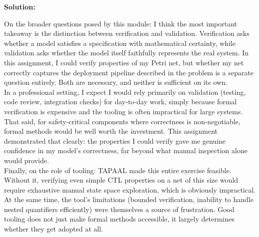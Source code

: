\documentclass[10pt]{article}
\newcounter{question}
\newenvironment{solution}{
	\vspace{1em}\par\large\textbf{{Solution:}}\par\vspace{1em}
}{
	\vspace{1em}
}
\begin{document}
\begin{solution}
	On the broader questions posed by this module: I think the most important takeaway is the distinction between verification and validation. Verification asks whether a model satisfies a specification with mathematical certainty, while validation asks whether the model itself faithfully represents the real system. In this assignment, I could verify properties of my Petri net, but whether my net correctly captures the deployment pipeline described in the problem is a separate question entirely. Both are necessary, and neither is sufficient on its own. \\

	In a professional setting, I expect I would rely primarily on validation (testing, code review, integration checks) for day-to-day work, simply because formal verification is expensive and the tooling is often impractical for large systems. That said, for safety-critical components where correctness is non-negotiable, formal methods would be well worth the investment. This assignment demonstrated that clearly: the properties I could verify gave me genuine confidence in my model's correctness, far beyond what manual inspection alone would provide. \\

	Finally, on the role of tooling: TAPAAL made this entire exercise feasible. Without it, verifying even simple CTL properties on a net of this size would require exhaustive manual state space exploration, which is obviously impractical. At the same time, the tool's limitations (bounded verification, inability to handle nested quantifiers efficiently) were themselves a source of frustration. Good tooling does not just make formal methods accessible, it largely determines whether they get adopted at all.
\end{solution}
\end{document}
